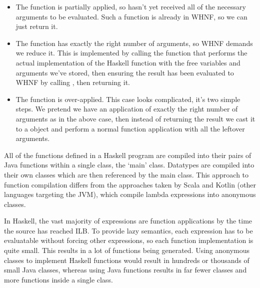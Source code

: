 \documentclass[dissertation.tex]{subfiles}
\begin{document}
{{{\begin{enumerate}
{                \begin{itemize}
                \item
                {

                    The function is partially applied, so hasn't yet received all of the necessary arguments to be
                    evaluated. Such a function is already in WHNF, so we can just return it.

                }
                \item
                {

                    The function has exactly the right number of arguments, so WHNF demands we reduce it. This is
                    implemented by calling the  function that performs the actual implementation of the
                    Haskell function with the free variables and arguments we've stored, then ensuring the result
                    has been evaluated to WHNF by calling , then returning it.

                }
                \item
                {

                    The function is over-applied. This case looks complicated, it's two simple steps. We pretend we
                    have an application of exactly the right number of arguments as in the above case, then instead
                    of returning the result we cast it to a  object and perform a normal function
                    application with all the leftover arguments.

                }
                \end{itemize}
            }
            \end{enumerate}

            All of the functions defined in a Haskell program are compiled into their pairs of Java functions within
            a single class, the `main' class. Datatypes are compiled into their own classes which are then
            referenced by the main class. This approach to function compilation differs from the approaches taken by
            Scala and Kotlin (other languages targeting the JVM), which compile lambda expressions into anonymous
            classes.

            In Haskell, the vast majority of expressions are function applications by the time the source has
            reached ILB. To provide lazy semantics, each expression has to be evaluatable without forcing other
            expressions, so each function implementation is quite small. This results in a lot of functions being
            generated. Using anonymous classes to implement Haskell functions would result in hundreds or thousands
            of small Java classes, whereas using Java functions results in far fewer classes and more functions
            inside a single class.

}}}
\end{document}
